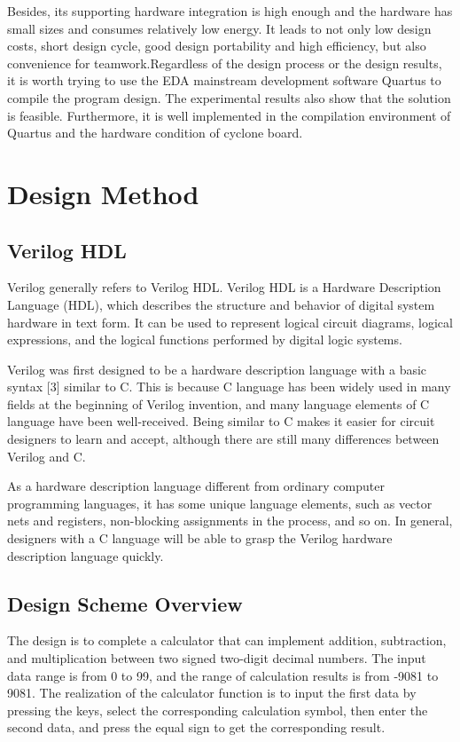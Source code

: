 \documentclass[11pt,journal,compsoc]{IEEEtran}
\begin{document}
Besides, its supporting hardware integration is high enough and the hardware has small sizes and consumes relatively low energy. It leads to not only low design costs, short design cycle, good design portability and high efficiency, but also convenience for teamwork.Regardless of the design process or the design results, it is worth trying to use the EDA mainstream development software Quartus to compile the program design. The experimental results also show that the solution is feasible. Furthermore, it is well implemented in the compilation environment of Quartus and the hardware condition of cyclone board. 

\section{Design Method}
\subsection{Verilog HDL}
Verilog generally refers to Verilog HDL. Verilog HDL is a Hardware Description Language (HDL), which describes the structure and behavior of digital system hardware in text form. It can be used to represent logical circuit diagrams, logical expressions, and the logical functions performed by digital logic systems.

Verilog was first designed to be a hardware description language with a basic syntax [3] similar to C. This is because C language has been widely used in many fields at the beginning of Verilog invention, and many language elements of C language have been well-received. Being similar to C makes it easier for circuit designers to learn and accept, although there are still many differences between Verilog and C. 

As a hardware description language different from ordinary computer programming languages, it has some unique language elements, such as vector nets and registers, non-blocking assignments in the process, and so on. In general, designers with a C language will be able to grasp the Verilog hardware description language quickly.

\subsection{Design Scheme Overview}
The design is to complete a calculator that can implement addition, subtraction, and multiplication between two signed two-digit decimal numbers. The input data range is from 0 to 99, and the range of calculation results is from -9081 to 9081. The realization of the calculator function is to input the first data by pressing the keys, select the corresponding calculation symbol, then enter the second data, and press the equal sign to get the corresponding result. 
\end{document}
